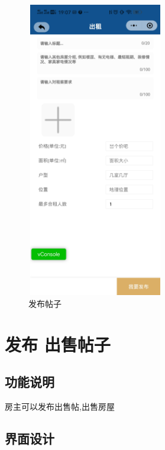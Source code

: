 \begin{figure}[htbp]
\begin{minipage}[t]{0.48\textwidth}
    \includegraphics[width=6cm,height=13cm]{design/image/fabu1.png}
    \caption{发布帖子}
    \end{minipage}
    \end{figure}

\newpage
\section{发布 出售帖子}

\subsection{功能说明}
房主可以发布出售帖,出售房屋
\subsection{界面设计}

